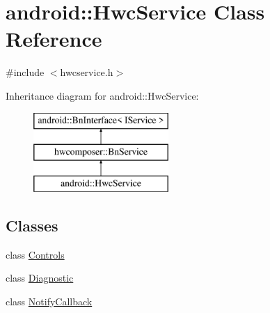 \hypertarget{classandroid_1_1HwcService}{}\section{android\+:\+:Hwc\+Service Class Reference}
\label{classandroid_1_1HwcService}


{\ttfamily \#include $<$hwcservice.\+h$>$}

Inheritance diagram for android\+:\+:Hwc\+Service\+:\begin{figure}[H]
\begin{center}
\leavevmode
\includegraphics[height=3.000000cm]{classandroid_1_1HwcService}
\end{center}
\end{figure}
\subsection*{Classes}
\begin{DoxyCompactItemize}
\item 
class \mbox{\hyperlink{classandroid_1_1HwcService_1_1Controls}{Controls}}
\item 
class \mbox{\hyperlink{classandroid_1_1HwcService_1_1Diagnostic}{Diagnostic}}
\item 
class \mbox{\hyperlink{classandroid_1_1HwcService_1_1NotifyCallback}{Notify\+Callback}}
\end{DoxyCompactItemize}
